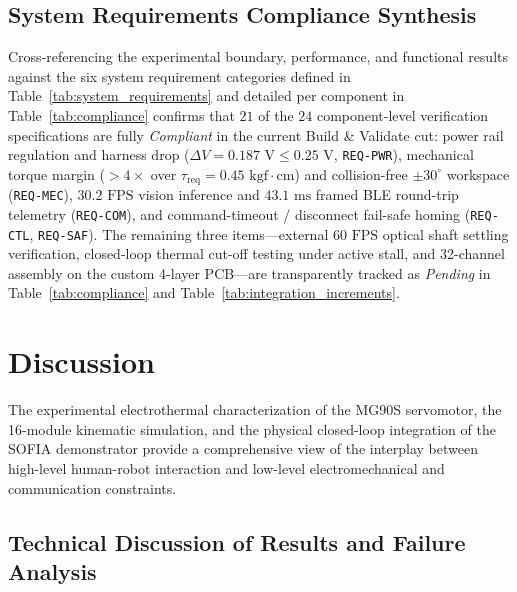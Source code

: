 \documentclass[lettersize,journal]{IEEEtran}
\begin{document}
	\subsection{System Requirements Compliance Synthesis}
	\label{sec:compliance_synthesis}
	
	Cross-referencing the experimental boundary, performance, and functional results against the six system requirement categories defined in Table~\ref{tab:system_requirements} and detailed per component in Table~\ref{tab:compliance} confirms that $21$ of the $24$ component-level verification specifications are fully \textit{Compliant} in the current Build \& Validate cut: power rail regulation and harness drop ($\Delta V = 0.187\text{ V} \le 0.25\text{ V}$, \texttt{REQ-PWR}), mechanical torque margin ($>4\times$ over $\tau_{\text{req}} = 0.45\text{ kgf}\cdot\text{cm}$) and collision-free $\pm 30^\circ$ workspace (\texttt{REQ-MEC}), $30.2\text{ FPS}$ vision inference and $43.1\text{ ms}$ framed BLE round-trip telemetry (\texttt{REQ-COM}), and command-timeout / disconnect fail-safe homing (\texttt{REQ-CTL}, \texttt{REQ-SAF}). The remaining three items—external $60\text{ FPS}$ optical shaft settling verification, closed-loop thermal cut-off testing under active stall, and 32-channel assembly on the custom 4-layer PCB—are transparently tracked as \textit{Pending} in Table~\ref{tab:compliance} and Table~\ref{tab:integration_increments}.
	
	\section{Discussion}
	\label{sec:discussion}
	
	The experimental electrothermal characterization of the MG90S
	servomotor, the 16-module kinematic simulation, and the physical closed-loop
	integration of the SOFIA demonstrator provide a comprehensive view of the
	interplay between high-level human-robot interaction and low-level
	electromechanical and communication constraints.
	
	\subsection{Technical Discussion of Results and Failure Analysis}
	\label{sec:disc_technical}
	
\end{document}
